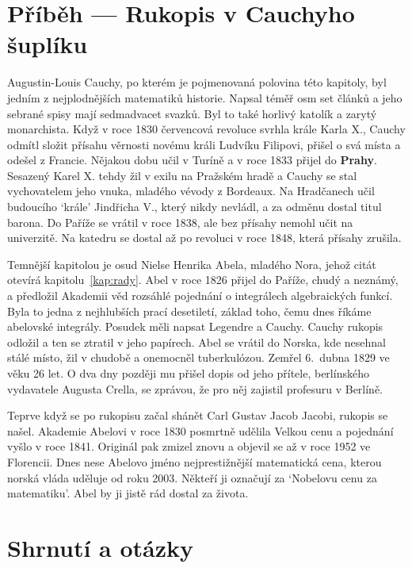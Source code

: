 \section{Příběh --- Rukopis v Cauchyho šuplíku}

Augustin-Louis Cauchy, po kterém je pojmenovaná polovina této kapitoly, byl jedním z nejplodnějších matematiků historie. Napsal téměř osm set článků a jeho sebrané spisy mají sedmadvacet svazků. Byl to také horlivý katolík a zarytý monarchista. Když v roce 1830 červencová revoluce svrhla krále Karla X., Cauchy odmítl složit přísahu věrnosti novému králi Ludvíku Filipovi, přišel o svá místa a odešel z Francie. Nějakou dobu učil v Turíně a v roce 1833 přijel do \textbf{Prahy}. Sesazený Karel X. tehdy žil v exilu na Pražském hradě a Cauchy se stal vychovatelem jeho vnuka, mladého vévody z Bordeaux. Na Hradčanech učil budoucího `krále' Jindřicha V., který nikdy nevládl, a za odměnu dostal titul barona. Do Paříže se vrátil v roce 1838, ale bez přísahy nemohl učit na univerzitě. Na katedru se dostal až po revoluci v roce 1848, která přísahy zrušila.

Temnější kapitolou je osud Nielse Henrika Abela, mladého Nora, jehož citát otevírá kapitolu~\ref{kap:rady}. Abel v roce 1826 přijel do Paříže, chudý a neznámý, a předložil Akademii věd rozsáhlé pojednání o integrálech algebraických funkcí. Byla to jedna z nejhlubších prací desetiletí, základ toho, čemu dnes říkáme abelovské integrály. Posudek měli napsat Legendre a Cauchy. Cauchy rukopis odložil a ten se ztratil v jeho papírech. Abel se vrátil do Norska, kde nesehnal stálé místo, žil v chudobě a onemocněl tuberkulózou. Zemřel 6.~dubna 1829 ve věku 26 let. O dva dny později mu přišel dopis od jeho přítele, berlínského vydavatele Augusta Crella, se zprávou, že pro něj zajistil profesuru v Berlíně.

Teprve když se po rukopisu začal shánět Carl Gustav Jacob Jacobi, rukopis se našel. Akademie Abelovi v roce 1830 posmrtně udělila Velkou cenu a pojednání vyšlo v roce 1841. Originál pak zmizel znovu a objevil se až v roce 1952 ve Florencii. Dnes nese Abelovo jméno nejprestižnější matematická cena, kterou norská vláda uděluje od roku 2003. Někteří ji označují za `Nobelovu cenu za matematiku'. Abel by ji jistě rád dostal za života.

\section{Shrnutí a otázky}


